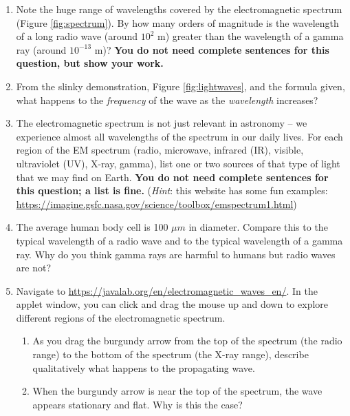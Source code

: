 \documentclass[11pt]{article}
\begin{document}
\begin{enumerate}
    \item Note the huge range of wavelengths covered by the electromagnetic spectrum (Figure \ref{fig:spectrum}). By how many orders of magnitude is the wavelength of a long radio wave (around $10^2$ m) greater than the wavelength of a gamma ray (around $10^{-13}$ m)? \textbf{You do not need complete sentences for this question, but show your work.}

    \item From the slinky demonstration, Figure \ref{fig:lightwaves}, and the formula given, what happens to the \emph{frequency} of the wave as the \emph{wavelength} increases? 
    
    \item The electromagnetic spectrum is not just relevant in astronomy -- we experience almost all wavelengths of the spectrum in our daily lives. For each region of the EM spectrum (radio, microwave, infrared (IR), visible, ultraviolet (UV), X-ray, gamma), list one or two sources of that type of light that we may find on Earth. \textbf{You do not need complete sentences for this question; a list is fine.} (\textit{Hint}: this website has some fun examples: \url{https://imagine.gsfc.nasa.gov/science/toolbox/emspectrum1.html})
    
    \item The average human body cell is 100 $\mu m$ in diameter. Compare this to the typical wavelength of a radio wave and to the typical wavelength of a gamma ray. Why do you think gamma rays are harmful to humans but radio waves are not?
    
    \item Navigate to \url{https://javalab.org/en/electromagnetic_waves_en/}. In the applet window, you can click and drag the mouse up and down to explore different regions of the electromagnetic spectrum.
    \begin{enumerate}
        \item As you drag the burgundy arrow from the top of the spectrum (the radio range) to the bottom of the spectrum (the X-ray range), describe qualitatively what happens to the propagating wave.
        
        \item When the burgundy arrow is near the top of the spectrum, the wave appears stationary and flat. Why is this the case?
    \end{enumerate}
    

\end{enumerate}
\end{document}

